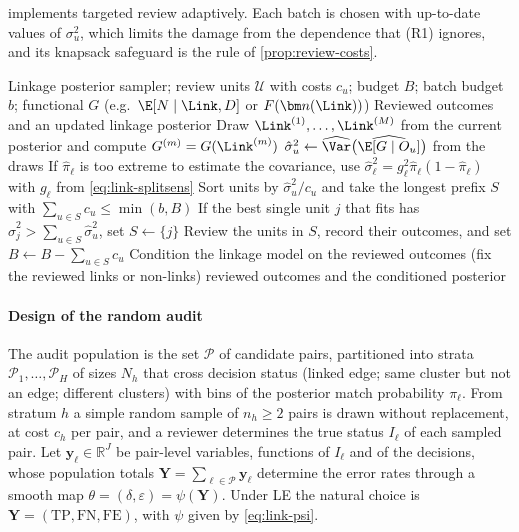  implements targeted review adaptively. Each batch is chosen with up-to-date values of $\sigma_u^2$, which limits the damage from the dependence that (R1) ignores, and its knapsack safeguard is the rule of \cref{prop:review-costs}.

\begin{algorithm}[t]
\caption{Targeted clerical review}\label{alg:review}
\begin{algorithmic}[1]
\Require Linkage posterior sampler; review units $\mathcal U$ with costs $c_u$; budget $B$; batch budget $b$; functional $G$ (e.g.\ $\E[N\mid\Link,D]$ or $F(\bm n(\Link))$)
\Ensure Reviewed outcomes and an updated linkage posterior
  \State Draw $\Link^{(1)},\dots,\Link^{(M)}$ from the current posterior and compute $G^{(m)}=G(\Link^{(m)})$
    \State $\hat\sigma_u^2\gets\widehat\Var\bigl(\widehat\E[G\mid O_u]\bigr)$ from the draws 
    \State If $\hat\pi_\ell$ is too extreme to estimate the covariance, use $\hat\sigma_\ell^2=g_\ell^2\hat\pi_\ell(1-\hat\pi_\ell)$ with $g_\ell$ from \eqref{eq:link-splitsens}
  \EndFor
  \State Sort units by $\hat\sigma_u^2/c_u$ and take the longest prefix $S$ with $\sum_{u\in S}c_u\le\min(b,B)$
  \State If the best single unit $j$ that fits has $\hat\sigma_j^2>\sum_{u\in S}\hat\sigma_u^2$, set $S\gets\{j\}$ 
  \State Review the units in $S$, record their outcomes, and set $B\gets B-\sum_{u\in S}c_u$
  \State Condition the linkage model on the reviewed outcomes (fix the reviewed links or non-links)
\EndWhile
\State \Return reviewed outcomes and the conditioned posterior
\end{algorithmic}
\end{algorithm}

\paragraph{Design of the random audit}
The audit population is the set $\mathcal P$ of candidate pairs, partitioned into strata $\mathcal P_1,\dots,\mathcal P_H$ of sizes $N_h$ that cross decision status (linked edge; same cluster but not an edge; different clusters) with bins of the posterior match probability $\pi_\ell$. From stratum $h$ a simple random sample of $n_h\ge2$ pairs is drawn without replacement, at cost $c_h$ per pair, and a reviewer determines the true status $I_\ell$ of each sampled pair. Let $\bm y_\ell\in\mathbb R^J$ be pair-level variables, functions of $I_\ell$ and of the decisions, whose population totals $\bm Y=\sum_{\ell\in\mathcal P}\bm y_\ell$ determine the error rates through a smooth map $\theta=(\delta,\varepsilon)=\psi(\bm Y)$. Under LE the natural choice is $\bm Y=(\mathrm{TP},\mathrm{FN},\mathrm{FE})$, with $\psi$ given by \eqref{eq:link-psi}.

